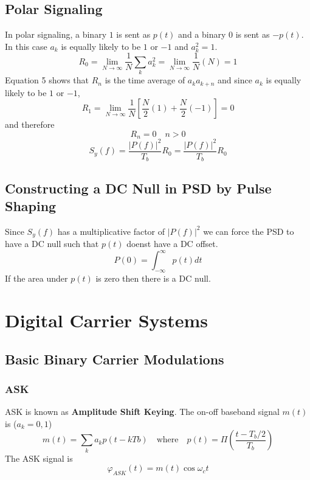 \documentclass{article}
\begin{document}
    \subsection{Polar Signaling}
    In polar signaling, a binary $1$ is sent as $p(t)$ and a binary $0$ is sent as $-p(t)$. In this case
    $a_k$ is equally likely to be $1$  or $-1$ and $a_k^2 = 1$.
    \begin{equation}
        R_0 = \lim_{N\rightarrow \infty} \frac{1}{N}\sum_k a_k^2 =  \lim_{N\rightarrow \infty} \frac{1}{N}(N) = 1
    \end{equation}
    Equation 5 shows that $R_n$ is the time average of $a_ka_{k+n}$ and since $a_k$ is equally likely
    to be $1$ or $-1$,
    \begin{equation}
        R_1 = \lim_{N \rightarrow \infty} \frac{1}{N}[\frac{N}{2}(1) + \frac{N}{2}(-1)] = 0
    \end{equation}
    and therefore 
    \begin{equation}
        R_n = 0 \quad n > 0
    \end{equation}
    \begin{equation}
        S_y(f) = \frac{|P(f)|^2}{T_b}R_0 = \frac{|P(f)|^2}{T_b}R_0
    \end{equation}

    \subsection{Constructing a DC Null in PSD by Pulse Shaping}
    Since $S_y(f)$ has a multiplicative factor of $|P(f)|^2$ we can force the PSD to have a DC null 
    such that $p(t)$ doenst have a DC offset.
    \begin{equation}
        P(0) = \int_{-\infty}^{\infty}p(t)dt
    \end{equation}
    If the area under $p(t)$ is zero then there is a DC null.

    \section{Digital Carrier Systems}
    \subsection{Basic Binary Carrier Modulations}
    \subsubsection{ASK}
    ASK is known as \textbf{Amplitude Shift Keying}. The on-off baseband signal $m(t)$ is ($a_k = 0,1$)
    \begin{equation}
        m(t) = \sum_k a_k p(t-kTb) \quad \textrm{where} \quad p(t) = \Pi (\frac{t-T_b/2}{T_b})
    \end{equation}
    The ASK signal is
    \begin{equation}
        \varphi_{ASK}(t) = m(t)\cos \omega_ct
    \end{equation}
\end{document}
